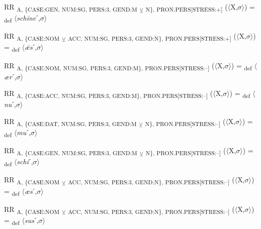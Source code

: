 {\begin{exe}
 RR \textsubscript{A, \{CASE:GEN, NUM:SG, PERS:3, GEND:M} \textsubscript{${\veebar}$}\textsubscript{ N\}, PRON.PERS[STRESS:+]} ($\langle$X,$\sigma $$\rangle$) = \textsubscript{def} $\langle$\textit{sch\=ine}ˊ,$\sigma $$\rangle$
\end{exe}

\begin{exe}
 RR \textsubscript{A, \{CASE:NOM} \textsubscript{${\veebar}$}\textsubscript{ ACC, NUM:SG, PERS:3, GEND:N\}, PRON.PERS[STRESS:+]} ($\langle$X,$\sigma $$\rangle$) = \textsubscript{def} $\langle$\textit{ǣs}ˊ,$\sigma $$\rangle$
\end{exe}

\begin{exe}
 RR \textsubscript{A, \{CASE:NOM, NUM:SG, PERS:3, GEND:M\}, PRON.PERS[STRESS:–]} ($\langle$X,$\sigma $$\rangle$) = \textsubscript{def} $\langle$\textit{ær}ˊ,$\sigma $$\rangle$
\end{exe}

\begin{exe}
 RR \textsubscript{A, \{CASE:ACC, NUM:SG, PERS:3, GEND:M\}, PRON.PERS[STRESS:–]} ($\langle$X,$\sigma $$\rangle$) = \textsubscript{def} $\langle$\textit{nu}ˊ,$\sigma $$\rangle$
\end{exe}

\begin{exe}
 RR \textsubscript{A, \{CASE:DAT, NUM:SG, PERS:3, GEND:M} \textsubscript{${\veebar}$}\textsubscript{ N\}, PRON.PERS[STRESS:–]} ($\langle$X,$\sigma $$\rangle$) = \textsubscript{def} $\langle$\textit{mu}ˊ,$\sigma $$\rangle$
\end{exe}

\begin{exe}
 RR \textsubscript{A, \{CASE:GEN, NUM:SG, PERS:3, GEND:M} \textsubscript{${\veebar}$}\textsubscript{ N\}, PRON.PERS[STRESS:–]} ($\langle$X,$\sigma $$\rangle$) = \textsubscript{def} $\langle$\textit{schi}ˊ,$\sigma $$\rangle$
\end{exe}

\begin{exe}
 RR \textsubscript{A, \{CASE:NOM} \textsubscript{${\veebar}$}\textsubscript{ ACC, NUM:SG, PERS:3, GEND:N\}, PRON.PERS[STRESS:–]} ($\langle$X,$\sigma $$\rangle$) = \textsubscript{def} $\langle$\textit{æs}ˊ,$\sigma $$\rangle$
\end{exe}

\begin{exe}
 RR \textsubscript{A, \{CASE:NOM} \textsubscript{${\veebar}$}\textsubscript{ ACC, NUM:SG, PERS:3, GEND:N\}, PRON.PERS[STRESS:–]} ($\langle$X,$\sigma $$\rangle$) = \textsubscript{def} $\langle$\textit{sus}ˊ,$\sigma $$\rangle$
\end{exe}

}
